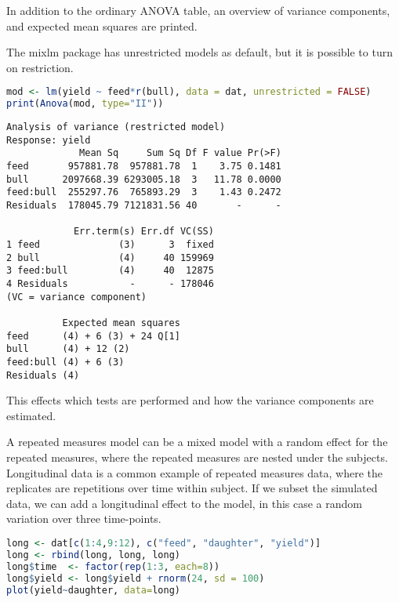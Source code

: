 In addition to the ordinary ANOVA table, an overview of variance
components, and expected mean squares are printed.

\label{restrictions}

The mixlm package has unrestricted models as default, but it is possible
to turn on restriction.

\begin{lstlisting}[language=R, columns=fullflexible, basicstyle=\linespread{0.85}\small\ttfamily, stringstyle=\color{DarkGreen}, keywordstyle=\color{blue}, commentstyle=\color{DarkGreen},]
mod <- lm(yield ~ feed*r(bull), data = dat, unrestricted = FALSE)
print(Anova(mod, type="II"))
\end{lstlisting}
\begin{Verbatim}[fontsize=\small]
Analysis of variance (restricted model)
Response: yield
             Mean Sq     Sum Sq Df F value Pr(>F)
feed       957881.78  957881.78  1    3.75 0.1481
bull      2097668.39 6293005.18  3   11.78 0.0000
feed:bull  255297.76  765893.29  3    1.43 0.2472
Residuals  178045.79 7121831.56 40       -      -

            Err.term(s) Err.df VC(SS)
1 feed              (3)      3  fixed
2 bull              (4)     40 159969
3 feed:bull         (4)     40  12875
4 Residuals           -      - 178046
(VC = variance component)

          Expected mean squares
feed      (4) + 6 (3) + 24 Q[1]
bull      (4) + 12 (2)
feed:bull (4) + 6 (3)
Residuals (4)
\end{Verbatim}

This effects which tests are performed and how the variance components
are estimated.

\label{repeated-measures}

A repeated measures model can be a mixed model with a random effect for
the repeated measures, where the repeated measures are nested under the
subjects. Longitudinal data is a common example of repeated measures
data, where the replicates are repetitions over time within subject. If
we subset the simulated data, we can add a longitudinal effect to the
model, in this case a random variation over three time-points.

\begin{lstlisting}[language=R, columns=fullflexible, basicstyle=\linespread{0.85}\small\ttfamily, stringstyle=\color{DarkGreen}, keywordstyle=\color{blue}, commentstyle=\color{DarkGreen},]
long <- dat[c(1:4,9:12), c("feed", "daughter", "yield")]
long <- rbind(long, long, long)
long$time  <- factor(rep(1:3, each=8))
long$yield <- long$yield + rnorm(24, sd = 100)
plot(yield~daughter, data=long)
\end{lstlisting}

